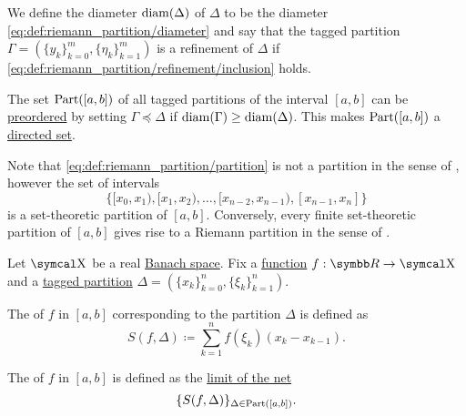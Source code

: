\begin{definition}
\begin{DefEnum}
    We define the diameter \( \operatorname{diam}(\Delta) \) of \( \Delta \) to be the diameter \eqref{eq:def:riemann_partition/diameter} and say that the tagged partition \( \Gamma = ( \{ y_k \}_{k=0}^m, \{ \eta_k \}_{k=1}^m ) \) is a refinement of \( \Delta \) if \eqref{eq:def:riemann_partition/refinement/inclusion} holds.

     The set \( \operatorname{Part}([a, b]) \) of all tagged partitions of the interval \( [a, b] \) can be \hyperref[def:preordered_set]{preordered} by setting \( \Gamma \preceq \Delta \) if \( \operatorname{diam}(\Gamma) \geq \operatorname{diam}(\Delta) \). This makes \( \operatorname{Part}([a, b]) \) a \hyperref[def:directed_set]{directed set}.
  \end{DefEnum}
\end{definition}

\begin{remark}\label{remark:set_and_riemann_partitions}
  Note that \eqref{eq:def:riemann_partition/partition} is not a partition in the sense of , however the set of intervals
  \begin{equation*}
    \Big\{ [x_0, x_1), [x_1, x_2), \ldots, [x_{n-2}, x_{n-1}), [x_{n-1}, x_n] \Big\}
  \end{equation*}
  is a set-theoretic partition of \( [a, b] \). Conversely, every finite set-theoretic partition of \( [a, b] \) gives rise to a Riemann partition in the sense of .
\end{remark}

\begin{definition}\label{def:riemann_sum}
  Let \( \CX \) be a real \hyperref[def:banach_space]{Banach space}. Fix a \hyperref[def:function/single_valued]{function} \( f: \BR \to \CX \) and a \hyperref[def:riemann_partition/tagged]{tagged partition} \( \Delta = ( \{ x_k \}_{k=0}^n, \{ \xi_k \}_{k=1}^n ) \).

  The  of \( f \) in \( [a, b] \) corresponding to the partition \( \Delta \) is defined as
  \begin{equation*}
    S(f, \Delta) \coloneqq \sum_{k=1}^n f(\xi_k) (x_k - x_{k-1}).
  \end{equation*}

  The  of \( f \) in \( [a, b] \) is defined as the \hyperref[def:net_convergence/limit]{limit of the net}
  \begin{equation*}
    \{ S(f, \Delta) \}_{\Delta \in \operatorname{Part}([a, b])}.
  \end{equation*}
\end{definition}
